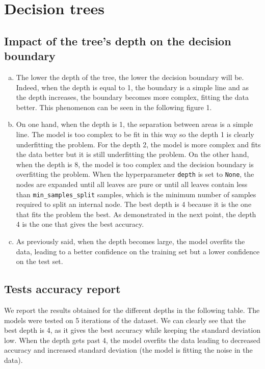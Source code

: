 \documentclass[12pt]{article}
\begin{document}
\section{Decision trees}
\subsection{Impact of the tree's depth on the decision boundary}
\begin{enumerate}[a)]
	\item The lower the depth of the tree, the lower the decision boundary will be. Indeed, when the depth is equal to 1, the boundary is a simple line and as the depth increases, the boundary becomes more complex, fitting the data better. This phenomenon can be seen in the following figure 1.
	\item On one hand, when the depth is 1, the separation between areas is a simple line. 
	The model is too complex to be fit in this way so the depth 1 is clearly underfitting the problem. 
	For the depth 2, the model is more complex and fits the data better but it is still underfitting the problem.
	On the other hand, when the depth is 8, the model is too complex and the decision boundary is overfitting the problem. 
	When the hyperparameter \verb|depth| is set to \verb|None|, the nodes are expanded until all leaves are pure or until all leaves contain less than \verb|min_samples_split| samples, which is the minimum number of samples required to split an internal node.
	The best depth is 4 because it is the one that fits the problem the best. As demonstrated in the next point, the depth 4 is the one that gives the best accuracy.
	\item As previously said, when the depth becomes large, the model overfits the data, leading to a better confidence on the training set but a lower confidence on the test set.
\end{enumerate}

\subsection{Tests accuracy report}
	We report the results obtained for the different depths in the following table. The models were tested on 5 iterations of the dataset. 
	We can clearly see that the best depth is 4, as it gives the best accuracy while keeping the standard deviation low.
	When the depth gets past 4, the model overfits the data leading to decreased accuracy and increased standard deviation (the model is fitting the noise in the data).
\end{document}
